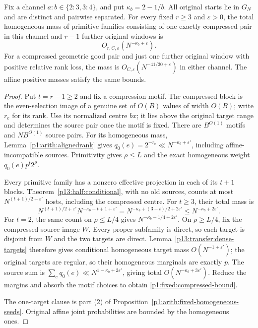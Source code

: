 \begin{proposition}
\label{p1:fixed:compressed}
Fix a channel \(a:b\in\{2:3,3:4\}\), and put
\(\kappa_b=2-1/b\). All original starts lie in \(G_N\) and are
distinct and pairwise separated. For every fixed \(r\ge3\) and
\(\varepsilon>0\), the total
homogeneous mass of primitive families consisting of
one exactly compressed pair in this channel and
\(r-1\) further original windows is
\begin{equation}
 O_{r,C,\varepsilon}
       (N^{-\kappa_b+\varepsilon}).
 \label{p1:fixed:compressed-bound}
\end{equation}
For a compressed geometric good pair and just one further original
window with positive relative rank loss, the mass is
\(O_{C,\varepsilon}(N^{-41/30+\varepsilon})\) in either channel.
The affine positive masses satisfy the same bounds.
\end{proposition}

\begin{proof}
Put $t=r-1\ge2$ and fix a compression motif. The compressed block
is the even-selection image of a genuine set of $O(B)$ values of
width $O(B)$; write $r_e$ for its rank.
Use its normalized centre $bx$; it lies above the original target
range and determines the source pair once the motif is fixed.
There are $B^{O(1)}$ motifs and $NB^{O(1)}$ source pairs.
For its homogeneous mass, Lemma~\ref{p1:arith:alignedrank} gives
$q_0(e)=2^{-r_e}\ll N^{-\kappa_b+\varepsilon'}$, including
affine-incompatible sources. Primitivity gives $\rho\le L$ and
the exact homogeneous weight $q_0(e)p^t2^\rho$.

Every primitive family has a nonzero effective projection in each
of its $t+1$ blocks. Theorem~\ref{p13:half:conditional}, with no old
sources, counts at most $N^{(t+1)/2+\varepsilon'}$ hosts,
including the compressed centre. For $t\ge3$, their total mass is
\[
 N^{(t+1)/2+\varepsilon'}N^{-\kappa_b-t+1+\varepsilon'}
   =N^{-\kappa_b+(3-t)/2+2\varepsilon'}
   \le N^{-\kappa_b+2\varepsilon'}.
\]
For $t=2$, the same count on $\rho\le L/4$ gives
$N^{-\kappa_b-1/4+2\varepsilon'}$.
On $\rho\ge L/4$, fix the compressed source image $W$.
Every proper subfamily is direct, so each target is disjoint from
$W$ and the two targets are direct. Lemma~\ref{p13:transfer:dense-targets}
therefore gives conditional homogeneous target mass
$O(N^{-1+\varepsilon'})$; the original targets are regular, so their
homogeneous marginals are exactly $p$.
The source sum is $\sum_e q_0(e)\ll N^{1-\kappa_b+2\varepsilon'}$,
giving total $O(N^{-\kappa_b+3\varepsilon'})$.
Reduce the margins and absorb the motif choices to obtain
\eqref{p1:fixed:compressed-bound}.

The one-target clause is part (2) of
Proposition~\ref{p1:arith:fixed-homogeneous-seeds}.
Original affine joint probabilities are bounded by the homogeneous ones.
\end{proof}

